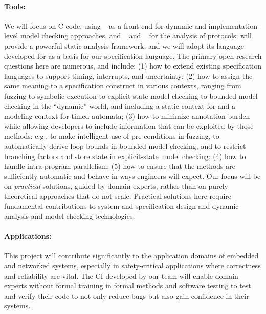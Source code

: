 \paragraph{Tools:} We will focus on C code, using \deepstate~\cite{DeepState}
as a front-end for dynamic and implementation-level model checking approaches, and
\uppaal~\cite{uppaal} and
\prism~\cite{KNP2011:CAV} for the analysis of protocols; \framac will
provide a powerful static analysis framework, and we will adopt its
\acsl language developed for \framac as a basis for our specification language.  The primary open research questions here are numerous, and include:
(1) how to extend existing specification languages to support timing, interrupts,
and uncertainty;
(2) how to assign the same meaning to a specification construct in
  various contexts, ranging from fuzzing to symbolic execution to
  explicit-state model checking to bounded model checking in the
  ``dynamic'' \deepstate world, and including a static context for
  \framac and a modeling context for timed automata;
(3) how to minimize annotation burden while allowing developers to
include information that can be exploited by those methods: e.g., to
make intelligent use of pre-conditions in fuzzing, to automatically
derive loop bounds in bounded model checking, and to restrict
branching factors and store state in explicit-state model checking;
(4) how to handle intra-program parallelism;
(5) how to ensure that the methods are sufficiently automatic
  and behave in ways engineers will expect.
Our focus will be on \emph{practical} solutions, guided by domain experts, rather than on purely theoretical approaches
that do not scale. Practical solutions here require
fundamental contributions to system and specification design and
dynamic analysis and model checking technologies.

\paragraph{Applications:}
This project will contribute significantly to the application domains of embedded and networked systems, especially in safety-critical applications where correctness and reliability are vital.
The CI %
developed by our team will enable domain experts without formal training in formal methods and software testing to test and verify their code to not only reduce bugs but also gain confidence in their systems.


